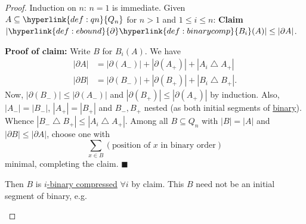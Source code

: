 \documentclass{article}
\newcommand{\sym}{\bigtriangleup}
\let\subset\subseteq
\begin{document}
\begin{proof}
  Induction on $n$: $n=1$ is immediate.
  Given $A \subset \hyperlink{def:qn}{Q_n}$ for $n > 1$ and $1 \leq i \leq n$: \textbf{Claim} $|\hyperlink{def:ebound}{\partial} \hyperlink{def:binarycomp}{B_i}(A)| \leq |\partial A|$.

  \textbf{Proof of claim:} Write $B$ for $B_i(A)$.
  We have
  \begin{align*}
    |\partial A| &= |\partial(A_-)| + |\partial(A_+)| + |A_i \sym A_+| \\
    |\partial B| &= |\partial(B_-)| + |\partial(B_+)| + |B_i \sym B_+|.
  \end{align*}
  Now, $|\partial (B_-)| \leq |\partial (A_-)|$ and $|\partial(B_+)| \leq |\partial(A_+)|$ by induction.
  Also, $|A_-| = |B_-|$, $|A_+| = |B_+|$ and $B_-, B_+$ nested (as both initial segments of \hyperlink{def:binary}{binary}).
  Whence $|B_- \sym B_+| \leq |A_i \sym A_+|$.
  Among all $B \subset Q_n$ with $|B| = |A|$ and $|\partial B| \leq |\partial A|$, choose one with
  \begin{equation*}\sum_{x \in B} (\text{position of $x$ in binary order})\end{equation*}
  minimal, completing the claim. $\blacksquare$

  Then $B$ is \hyperlink{def:binarycomp}{$i$-binary compressed} $\forall i$ by claim.
  This $B$ need not be an initial segment of binary, e.g.\
  \begin{center}
  \end{center}


\end{proof}
\end{document}
